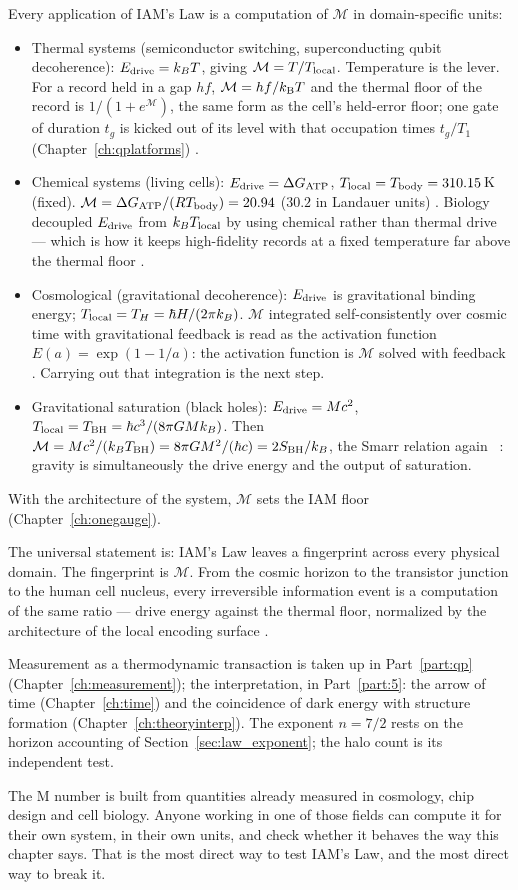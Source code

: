 Every application of IAM's Law is a computation of $\mathcal M$ in domain-specific units:
\begin{itemize}
\item Thermal systems (semiconductor switching, superconducting qubit decoherence): $E_{\rm drive}=k_BT$, giving $\mathcal M=T/T_{\rm local}$.
Temperature is the lever. For a record held in a gap $hf$, $\mathcal M=hf/k_{\mathrm B} T$ and the thermal floor of the record is $1/(1+e^{\mathcal M})$,
the same form as the cell's held-error floor; one gate of duration $t_g$ is kicked out of its level with that occupation times $t_g/T_1$ (Chapter~\ref{ch:qplatforms}) \derived.
\item Chemical systems (living cells): $E_{\rm drive}=\Delta G_{\rm ATP}$, $T_{\rm local}=T_{\rm body}=310.15$\,K (fixed). $\mathcal M=\Delta G_{\rm ATP}/(RT_{\rm body})=20.94$
($30.2$ in Landauer units) \calc. Biology decoupled $E_{\rm drive}$ from $k_BT_{\rm local}$ by using chemical rather than thermal drive --- which is how it
keeps high-fidelity records at a fixed temperature far above the thermal floor \interp.
\item Cosmological (gravitational decoherence): $E_{\rm drive}$ is gravitational binding energy; $T_{\rm local}=T_H=\hbar H/(2\pi k_B)$. $\mathcal M$
integrated self-consistently over cosmic time with gravitational feedback is read as the activation function $E(a)=\exp(1-1/a)$: the activation
function is $\mathcal M$ solved with feedback \conjecture. Carrying out that integration is the next step.
\item Gravitational saturation (black holes): $E_{\rm drive}=Mc^2$, $T_{\rm local}=T_{\rm BH}=\hbar c^3/(8\pi GMk_B)$. Then
$\mathcal M=Mc^2/(k_BT_{\rm BH})=8\pi GM^2/(\hbar c)=2S_{\rm BH}/k_B$, the Smarr relation again~\cite{Smarr1973} \derived: gravity is simultaneously the drive
energy and the output of saturation.
\end{itemize}
With the architecture of the system, $\mathcal M$ sets the IAM floor (Chapter~\ref{ch:onegauge}).

The universal statement is: IAM's Law leaves a fingerprint across every physical domain. The fingerprint is $\mathcal M$. From the cosmic horizon to the
transistor junction to the human cell nucleus, every irreversible information event is a computation of the same ratio --- drive energy against the
thermal floor, normalized by the architecture of the local encoding surface \interp.

Measurement as a thermodynamic transaction is taken up in Part~\ref{part:qp} (Chapter~\ref{ch:measurement}); the interpretation, in Part~\ref{part:5}: the arrow of
time (Chapter~\ref{ch:time}) and the coincidence of dark energy with structure formation (Chapter~\ref{ch:theoryinterp}). The exponent $n=7/2$ rests on the
horizon accounting of Section~\ref{sec:law_exponent}; the halo count is its independent test.

The M number is built from quantities already measured in cosmology, chip design and cell biology. Anyone working in one of those fields can compute it for their own system, in their own units, and check whether it behaves the way this chapter says. That is the most direct way to test IAM's Law, and the most direct way to break it.
